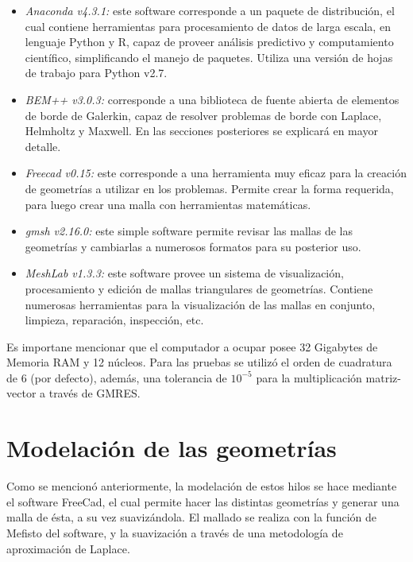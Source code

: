 \documentclass[12pt,letterpaper]{article}
\numberwithin{equation}{section}
\begin{document}
\begin{itemize}
	\item \textit{Anaconda v4.3.1:} este software corresponde a un paquete de distribución, el cual contiene herramientas para procesamiento de datos de larga escala, en lenguaje Python y R, capaz de proveer análisis predictivo y computamiento científico, simplificando el manejo de paquetes. Utiliza una versión de hojas de trabajo para Python v2.7.
	
	\item \textit{BEM++ v3.0.3:} corresponde a una biblioteca de fuente abierta de elementos de borde de Galerkin, capaz de resolver problemas de borde con Laplace, Helmholtz y Maxwell. En las secciones posteriores se explicará en mayor detalle.
	
	\item \textit{Freecad v0.15:} este corresponde a una herramienta muy eficaz para la creación de geometrías a utilizar en los problemas. Permite crear la forma requerida, para luego crear una malla con herramientas matemáticas.
	
	\item \textit{gmsh v2.16.0:} este simple software permite revisar las mallas de las geometrías y cambiarlas a numerosos formatos para su posterior uso.
	
	\item \textit{MeshLab v1.3.3:} este software provee un sistema de visualización, procesamiento y edición de mallas triangulares de geometrías. Contiene numerosas herramientas para la visualización de las mallas en conjunto, limpieza, reparación, inspección, etc. 
	
	
\end{itemize}


Es importane mencionar que el computador a ocupar posee 32 Gigabytes de Memoria RAM y 12 núcleos. Para las pruebas se utilizó el orden de cuadratura de 6 (por defecto), además, una tolerancia de $10^{-5}$ para la multiplicación matriz-vector a través de GMRES.

\section{Modelación de las geometrías}


Como se mencionó anteriormente, la modelación de estos hilos se hace mediante el software FreeCad, el cual permite hacer las distintas geometrías y generar una malla de ésta, a su vez suavizándola. El mallado se realiza con la función de Mefisto del software, y la suavización a través de una metodología de aproximación de Laplace.
\end{document}
